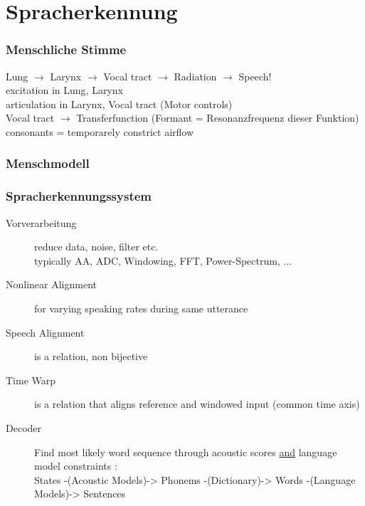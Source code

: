 
\chapter{Spracherkennung}

\subsection{Menschliche Stimme}

Lung $\rightarrow$ Larynx $\rightarrow$ Vocal tract $\rightarrow$ Radiation $\rightarrow$ Speech! \\
excitation in Lung, Larynx \\
articulation in Larynx, Vocal tract (Motor controls) \\
Vocal tract $\rightarrow$ Transferfunction (Formant = Resonanzfrequenz dieser Funktion) \\
consonants = temporarely constrict airflow

\subsection{Menschmodell}


\subsection{Spracherkennungssystem}


\begin{description}
	\item[Vorverarbeitung] reduce data, noise, filter etc.\\ typically AA, ADC, Windowing, FFT, Power-Spectrum, ...
	\item[Nonlinear Alignment] for varying speaking rates during same utterance
	\item[Speech Alignment] is a relation, non bijective
	\item[Time Warp] is a relation that aligns reference and windowed input (common time axis)
	\item[Decoder] Find most likely word sequence through acoustic scores \underline{and} language model constraints :\\
	States -(Acoustic Models)-> Phonems -(Dictionary)-> Words -(Language Models)-> Sentences
\end{description}

